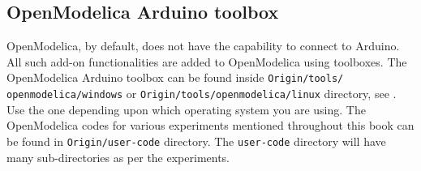 \subsection{OpenModelica Arduino toolbox}\label{sec:load-om-toolbox}
OpenModelica, by default, does not have the capability to connect to Arduino. 
All such add-on functionalities are added to OpenModelica using toolboxes.  
The OpenModelica Arduino toolbox can be found inside {\tt Origin/tools/\\openmodelica/windows} or {\tt Origin/tools/openmodelica/linux} directory,
see .  Use the one depending upon
which operating system you are using. The OpenModelica codes for various
experiments mentioned throughout this book can be found in {\tt Origin/user-code} directory. The {\tt user-code} directory will have
many sub-directories as per the experiments. 

